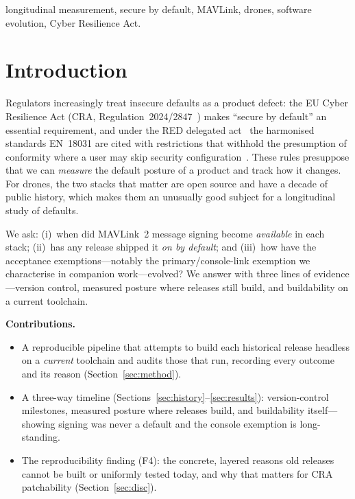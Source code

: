 \documentclass[conference]{IEEEtran}
\begin{document}
\begin{IEEEkeywords}
longitudinal measurement, secure by default, MAVLink, drones, software
evolution, Cyber Resilience Act.
\end{IEEEkeywords}

\section{Introduction}
Regulators increasingly treat insecure defaults as a product defect: the EU
Cyber Resilience Act (CRA, Regulation~2024/2847~\cite{cra2024}) makes ``secure by
default'' an essential requirement, and under the RED delegated
act~\cite{red2022_30} the harmonised standards EN~18031 are cited with
restrictions that withhold the presumption of conformity where a user may skip
security configuration~\cite{ec2025_138}. These
rules presuppose that we can \emph{measure} the default posture of a product and
track how it changes. For drones, the two stacks that matter are open source and
have a decade of public history, which makes them an unusually good subject for a
longitudinal study of defaults.

We ask: (i)~when did MAVLink~2 message signing become \emph{available} in each
stack; (ii)~has any release shipped it \emph{on by default}; and
(iii)~how have the acceptance exemptions---notably the primary/console-link
exemption we characterise in companion work---evolved? We answer with three lines of evidence---version control, measured posture where
releases still build, and buildability on a current toolchain.

\noindent\textbf{Contributions.}
\begin{itemize}
\item A reproducible pipeline that attempts to build each historical release
headless on a \emph{current} toolchain and audits those that run, recording every
outcome and its reason (Section~\ref{sec:method}).
\item A three-way timeline (Sections~\ref{sec:history}--\ref{sec:results}):
version-control milestones, measured posture where releases build, and
buildability itself---showing signing was never a default and the console
exemption is long-standing.
\item The reproducibility finding (F4): the concrete, layered reasons old
releases cannot be built or uniformly tested today, and why that matters for CRA
patchability (Section~\ref{sec:disc}).
\end{itemize}
\end{document}
